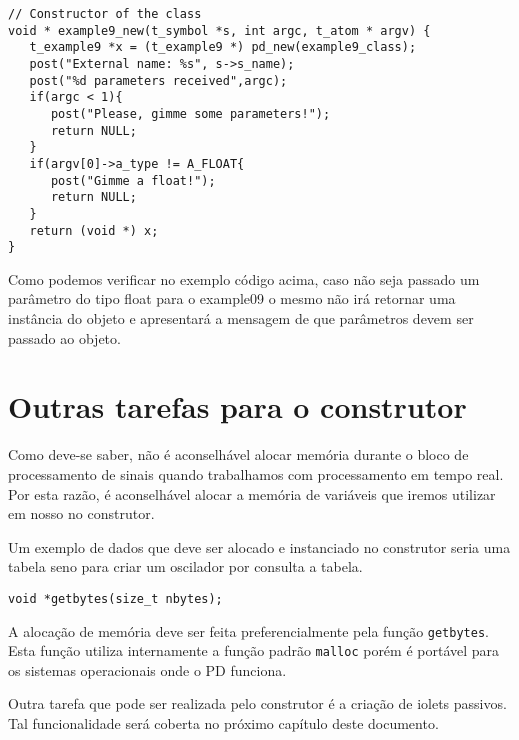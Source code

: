 \begin{lstlisting}[caption=Validando parâmetros na construção de um objeto]
// Constructor of the class
void * example9_new(t_symbol *s, int argc, t_atom * argv) {
   t_example9 *x = (t_example9 *) pd_new(example9_class);
   post("External name: %s", s->s_name);
   post("%d parameters received",argc);
   if(argc < 1){
      post("Please, gimme some parameters!");
      return NULL;
   }
   if(argv[0]->a_type != A_FLOAT{
      post("Gimme a float!");
      return NULL;
   }
   return (void *) x;
}
\end{lstlisting}

Como podemos verificar no exemplo código acima, caso não seja passado um parâmetro
do tipo float para o example09 o mesmo não irá retornar uma instância do objeto
e apresentará a mensagem de que parâmetros devem ser passado ao objeto.

\section{Outras tarefas para o construtor}

Como deve-se saber, não é aconselhável alocar memória durante o bloco de
processamento de sinais quando trabalhamos com processamento em tempo real.
Por esta razão, é aconselhável alocar a memória de variáveis que iremos utilizar
em nosso \external no construtor.

Um exemplo de dados que deve ser alocado e instanciado no construtor seria uma
tabela seno para criar um oscilador por consulta a tabela.

\begin{lstlisting}[caption=Função para a alocação de memória]
void *getbytes(size_t nbytes);
\end{lstlisting}

A alocação de memória deve ser feita preferencialmente pela função \texttt{getbytes}.
Esta função utiliza internamente a função padrão \texttt{malloc} porém é portável
para os sistemas operacionais onde o PD funciona.

Outra tarefa que pode ser realizada pelo construtor é a criação de iolets
passivos.
Tal funcionalidade será coberta no próximo capítulo deste documento.

